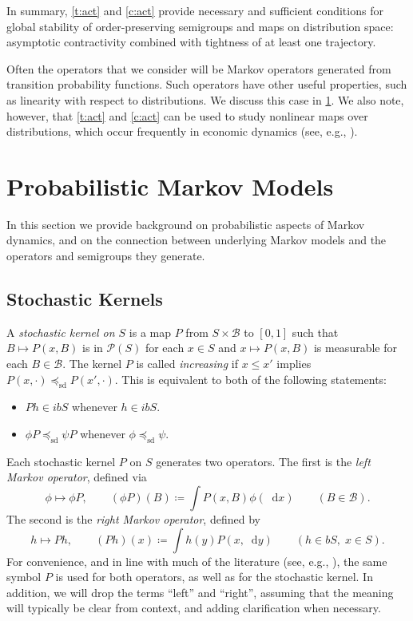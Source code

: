 \documentclass[12pt,reqno]{amsart}
\numberwithin{equation}{section}
\theoremstyle{definition}
\newcommand{\1}{\mathbbm{1}}
\newcommand{\diff}{\mathop{}\!\mathrm{d}}
\newcommand{\bB}{\mathscr{B}}
\newcommand{\pP}{\mathscr{P}}
\newcommand{\precsd}{\preceq_{\textrm{sd}}}
\newcommand{\navy}[1]{\textit{\textcolor{blue!40!black}{#1}}}
\begin{document}
In summary, \cref{t:act} and \cref{c:act} provide necessary and sufficient
conditions for global stability of order-preserving semigroups and maps on
distribution space: asymptotic contractivity combined with tightness of at
least one trajectory.

Often the operators that we consider will be Markov operators generated from
transition probability functions. Such operators have other useful properties,
such as linearity with respect to distributions.  We discuss this case in
\cref{s:pmm}. We also note, however, that \cref{t:act} and \cref{c:act} can be
used to study nonlinear maps over distributions, which occur frequently in
economic dynamics (see, e.g., \cite{light2026invariant}). 



\section{Probabilistic Markov Models}\label{s:pmm}

In this section we provide background on probabilistic aspects of Markov
dynamics, and on the connection between underlying Markov models and the
operators and semigroups they generate.


\subsection{Stochastic Kernels}

A \navy{stochastic kernel on $S$} is a map $P$ from $S \times \bB$ to $[0,1]$
such that $B \mapsto P(x,B)$ is in $\pP(S)$ for each $x \in S$ and $x \mapsto
P(x,B)$ is measurable for each $B \in \bB$.  The kernel $P$ is called
\navy{increasing} if $x \leq x'$ implies $P(x, \cdot) \precsd P(x', \cdot)$.
This is equivalent to both of the following statements:
%
\begin{itemize}
    \item $Ph \in ibS$ whenever $h \in ibS$.
    \item $\phi P \precsd \psi P$ whenever $\phi \precsd \psi$.
\end{itemize}
%
Each stochastic kernel $P$ on $S$ generates two operators.  The first is the
\navy{left Markov operator}, defined via
%
\begin{equation}\label{eq:lmo}
    \phi \mapsto \phi P, \qquad
    (\phi P) (B)  \coloneq \int P(x,B) \phi(\diff x) \qquad (B \in \bB).
\end{equation}
%
The second is the \navy{right Markov operator}, defined by
%
\begin{equation}\label{eq:rmo}
    h \mapsto Ph, \qquad
    (Ph)(x) \coloneq \int h(y) P(x,\diff y)
    \qquad (h \in bS, \; x \in S).
\end{equation}
%
For convenience, and in line with much of the literature (see, e.g.,
\cite{meyn2009markov}), the same symbol $P$ is used for both operators, as well
as for the stochastic kernel.  In addition, we will drop the terms ``left'' and
``right'', assuming that the meaning will typically be clear from context, and
adding clarification when necessary.
\end{document}
